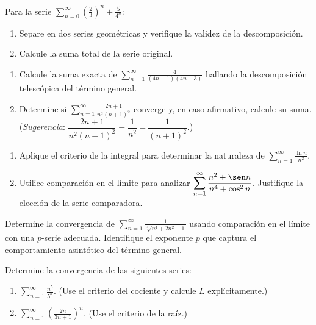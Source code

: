 \begin{prob}
Para la serie $\displaystyle\sum_{n=0}^\infty \left(\frac{2}{3}\right)^n
+ \frac{5}{4^n}$:
\begin{enumerate}
  \item Separe en dos series geométricas y verifique la validez de la
        descomposición.
  \item Calcule la suma total de la serie original.
\end{enumerate}
\end{prob}


\begin{prob}
\begin{enumerate}
  \item Calcule la suma exacta de $\displaystyle\sum_{n=1}^\infty
        \frac{4}{(4n-1)(4n+3)}$ hallando la descomposición telescópica
        del término general.
  \item Determine si $\displaystyle\sum_{n=1}^\infty\frac{2n+1}{n^2(n+1)^2}$
        converge y, en caso afirmativo, calcule su suma.
        (\textit{Sugerencia}: $\dfrac{2n+1}{n^2(n+1)^2}=
        \dfrac{1}{n^2}-\dfrac{1}{(n+1)^2}$.)
\end{enumerate}
\end{prob}

\begin{prob}
\begin{enumerate}
  \item Aplique el criterio de la integral para determinar la naturaleza
        de $\displaystyle\sum_{n=1}^\infty \frac{\ln n}{n^2}$.
  \item Utilice comparación en el límite para analizar
        $\displaystyle\sum_{n=1}^\infty \frac{n^2+\sen n}{n^4+\cos^2 n}$.
        Justifique la elección de la serie comparadora.
\end{enumerate}
\end{prob}

\begin{prob}
Determine la convergencia de $\displaystyle\sum_{n=1}^\infty
\frac{1}{\sqrt[3]{n^4+2n^2+1}}$ usando comparación en el límite con una
$p$-serie adecuada. Identifique el exponente $p$ que captura el
comportamiento asintótico del término general.
\end{prob}

\begin{prob}
Determine la convergencia de las siguientes series:
\begin{enumerate}
  \item $\displaystyle\sum_{n=1}^\infty \frac{n^5}{5^n}$.
        (Use el criterio del cociente y calcule $L$ explícitamente.)
  \item $\displaystyle\sum_{n=1}^\infty \left(\frac{2n}{3n+1}\right)^n$.
        (Use el criterio de la raíz.)
\end{enumerate}
\end{prob}

